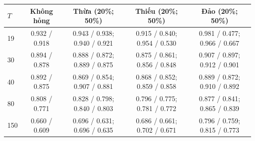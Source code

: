 \begin{tabular}{lcccc}
\toprule
$T$ & Không hỏng & Thừa (20\%; 50\%) & Thiếu (20\%; 50\%) & Đảo (20\%; 50\%)\\
\midrule
19 & 0.932 / 0.918 & 0.943 / 0.938; 0.940 / 0.921 & 0.915 / 0.840; 0.954 / 0.530 & 0.981 / 0.477; 0.966 / 0.667 \\
30 & 0.894 / 0.878 & 0.888 / 0.872; 0.889 / 0.875 & 0.875 / 0.861; 0.856 / 0.848 & 0.907 / 0.897; 0.912 / 0.901 \\
40 & 0.892 / 0.875 & 0.869 / 0.854; 0.907 / 0.881 & 0.868 / 0.852; 0.859 / 0.858 & 0.889 / 0.872; 0.910 / 0.892 \\
80 & 0.808 / 0.771 & 0.828 / 0.798; 0.840 / 0.803 & 0.796 / 0.775; 0.781 / 0.772 & 0.877 / 0.841; 0.865 / 0.839 \\
150 & 0.660 / 0.609 & 0.696 / 0.631; 0.696 / 0.635 & 0.686 / 0.661; 0.702 / 0.671 & 0.796 / 0.759; 0.815 / 0.773 \\
\bottomrule
\end{tabular}

